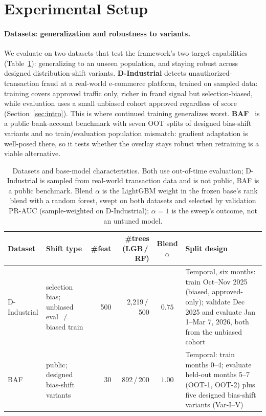 \documentclass[11pt]{article}
\begin{document}
\section{Experimental Setup}\label{sec:setup}

\paragraph{Datasets: generalization and robustness to variants.}
We evaluate on two datasets that test the framework's two target capabilities
(Table~\ref{tab:datasets}): generalizing to an unseen population, and staying robust across designed
distribution-shift variants.
\textbf{D-Industrial} detects unauthorized-transaction fraud at a real-world e-commerce platform,
trained on sampled data: training covers approved traffic only, richer in fraud signal but
selection-biased, while evaluation uses a small unbiased cohort approved regardless of score
(Section~\ref{sec:intro}). This is where continued training generalizes worst.
\textbf{BAF}~\citep{jesus2022baf} is a public bank-account benchmark with seven OOT splits of
designed bias-shift variants and no train/evaluation population mismatch: gradient adaptation is
well-posed there, so it tests whether the overlay stays robust when retraining is a viable
alternative.

\begin{table}[t]
  \centering
  \footnotesize
  \setlength{\tabcolsep}{5pt}
  \caption{Datasets and base-model characteristics. Both use out-of-time evaluation; D-Industrial is
    sampled from real-world transaction data and is not public, BAF is a public benchmark.
    Blend $\alpha$ is the LightGBM weight in the frozen base's rank blend with a random forest,
    swept on both datasets and selected by validation PR-AUC (sample-weighted on D-Industrial); $\alpha{=}1$ is the sweep's outcome,
    not an untuned model.}
  \label{tab:datasets}
  \begin{tabular}{@{}l p{2.7cm} r r c p{5.3cm}@{}}
    \toprule
    Dataset & Shift type & \#feat & \#trees (LGB\,/\,RF) & Blend $\alpha$ & Split design \\
    \midrule
    D-Industrial
      & selection bias; unbiased eval $\neq$ biased train
      & 500 & 2{,}219\,/\,500 & $0.75$
      & Temporal, six months: train Oct--Nov 2025 (biased, approved-only); validate Dec 2025 and
        evaluate Jan 1--Mar 7, 2026, both from the unbiased cohort \\[2pt]
    BAF
      & public; designed bias-shift variants
      & 30 & 892\,/\,200 & $1.00$
      & Temporal: train months 0--4; evaluate held-out months 5--7 (OOT-1, OOT-2) plus five
        designed bias-shift variants (Var-I--V) \\
    \bottomrule
  \end{tabular}
\end{table}
\end{document}

